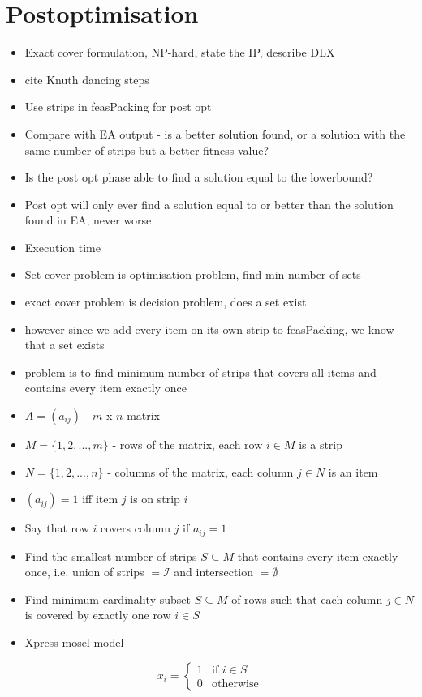 \documentclass{elsarticle}
\begin{document}
\section{Postoptimisation}
\label{sec:postopt}
\begin{itemize}
	\item Exact cover formulation, NP-hard, state the IP, describe DLX
	\item cite Knuth dancing steps
	\item Use strips in feasPacking for post opt
	\item Compare with EA output - is a better solution found, or a solution with the same number of strips but a better fitness value?
	\item Is the post opt phase able to find a solution equal to the lowerbound?
	\item Post opt will only ever find a solution equal to or better than the solution found in EA, never worse
	\item Execution time
	\item Set cover problem is optimisation problem, find min number of sets
	\item exact cover problem is decision problem, does a set exist
	\item however since we add every item on its own strip to feasPacking, we know that a set exists
	\item problem is to find minimum number of strips that covers all items and contains every item exactly once
	\item $A = (a_{ij})$ - $m$ x $n$ matrix
	\item $M = \{1, 2,..., m\}$ - rows of the matrix, each row $i \in M$ is a strip
	\item $N = \{1, 2,...,n\}$ - columns of the matrix, each column $j \in N$ is an item
	\item $(a_{ij}) = 1$ iff item $j$ is on strip $i$
	\item Say that row $i$ covers column $j$ if $a_{ij} = 1$
	\item Find the smallest number of strips $S \subseteq M$ that contains every item exactly once, i.e. union of strips $= \mathcal{I}$ and intersection $= \emptyset$
	\item Find minimum cardinality subset $S \subseteq M$ of rows such that each column $j \in N$ is covered by exactly one row $i \in S$
	\item Xpress mosel model
\end{itemize}
\[x_i =
\begin{cases} 
1 & \text{if } i \in S \\
0 & \text{otherwise} 
\end{cases}
\]
\end{document}

